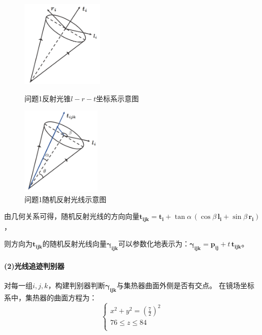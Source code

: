 \documentclass{article}
\numberwithin{equation}{subsection}
\begin{document}
\begin{figure}[htbp]
	\begin{minipage}[b]{0.5\linewidth}
		\centering
		\includegraphics[width=1.55in]{问题1-1反射光锥建系图.png}
		\caption{问题1反射光锥$l-r-t$坐标系示意图}
	\end{minipage}
	\begin{minipage}[b]{0.5\linewidth}
		\centering
		\includegraphics[width=1.5in]{问题1-1反射光锥随机光线示意图.png}
		\caption{问题1随机反射光线示意图}
	\end{minipage}
\end{figure}

\noindent
由几何关系可得，随机反射光线的方向向量$\bm{t_{ijk}}=\bm{t_i}+\tan\alpha\,(\cos\beta\,\bm{l_i}+\sin\beta\,\bm{r_i})$，

\noindent
则方向为$\bm{t_{ijk}}$的随机反射光线向量$\bm{\gamma_{ijk}}$可以参数化地表示为：$\bm{\gamma_{ijk}}=\bm{p_{ij}}+t\,\bm{t_{ijk}}$。

\paragraph{(2)光线追迹判别器}
对每一组$i,j,k$，构建判别器判断$\bm{\gamma_{ijk}}$与集热器曲面外侧是否有交点。
在镜场坐标系中，集热器的曲面方程为：
\begin{equation}
    \left\{\begin{array}{l}
        x^2+y^2=(\frac{7}{2})^2\\
        76\leq z\leq 84\\
    \end{array}\right.
\end{equation}
\end{document}
